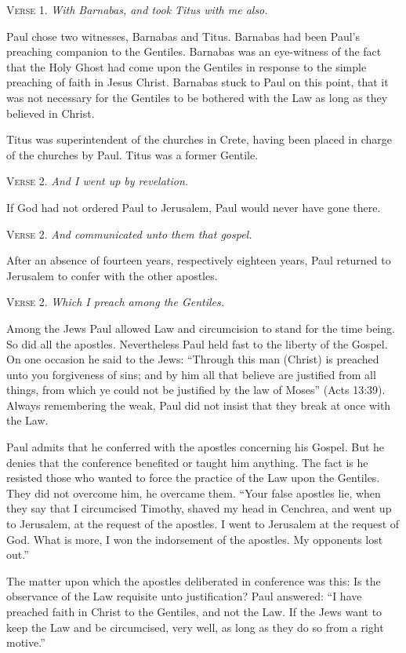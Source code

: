 \textsc{Verse} 1. \emph{With Barnabas, and took Titus with me also.}

Paul chose two witnesses, Barnabas and Titus. Barnabas had been Paul’s preaching companion to the Gentiles. Barnabas was an eye-witness of the fact that the Holy Ghost had come upon the Gentiles in response to the simple preaching of faith in Jesus Christ. Barnabas stuck to Paul on this point, that it was not necessary for the Gentiles to be bothered with the Law as long as they believed in Christ.

Titus was superintendent of the churches in Crete, having been placed in charge of the churches by Paul. Titus was a former Gentile.

\textsc{Verse} 2. \emph{And I went up by revelation.}

If God had not ordered Paul to Jerusalem, Paul would never have gone there.

\textsc{Verse} 2. \emph{And communicated unto them that gospel.}

After an absence of fourteen years, respectively eighteen years, Paul returned to Jerusalem to confer with the other apostles.

\textsc{Verse} 2. \emph{Which I preach among the Gentiles.}

Among the Jews Paul allowed Law and circumcision to stand for the time being. So did all the apostles. Nevertheless Paul held fast to the liberty of the Gospel. On one occasion he said to the Jews: “Through this man (Christ) is preached unto you forgiveness of sins; and by him all that believe are justified from all things, from which ye could not be justified by the law of Moses” (Acts 13:39). Always remembering the weak, Paul did not insist that they break at once with the Law.

Paul admits that he conferred with the apostles concerning his Gospel. But he denies that the conference benefited or taught him anything. The fact is he resisted those who wanted to force the practice of the Law upon the Gentiles. They did not overcome him, he overcame them. “Your false apostles lie, when they say that I circumcised Timothy, shaved my head in Cenchrea, and went up to Jerusalem, at the request of the apostles. I went to Jerusalem at the request of God. What is more, I won the indorsement of the apostles. My opponents lost out.”

The matter upon which the apostles deliberated in conference was this: Is the observance of the Law requisite unto justification? Paul answered: “I have preached faith in Christ to the Gentiles, and not the Law. If the Jews want to keep the Law and be circumcised, very well, as long as they do so from a right motive.”

